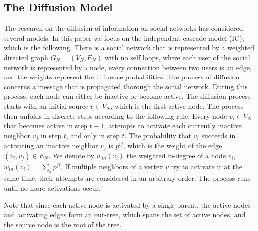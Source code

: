 \documentclass[sigconf,anonymous]{aamas}
\begin{document}
\subsection{The Diffusion Model}
\label{sec:IC_model}
The research on the diffusion of information on social networks has considered several models. In this paper we focus on the independent cascade model (IC), which is the following.
There is a social network that is represented by a weighted directed graph $G_N=(V_N,E_N)$ with no self loops, where each user of the social network is represented by a node, every connection between two users is an edge, and the weights represent the influence probabilities. 
The process of diffusion concerns a message that is propagated thorough the social network. During this process, each node can either be inactive or become active.
The diffusion process starts with an initial source   
$v\in V_N$, which is the first active node.
The process then unfolds in discrete steps according to the following rule. %
Every node $v_i\in V_N$ that becomes active in step $t-1$, attempts to activate each currently inactive neighbor $v_j$ in step $t$, and only in step $t$. The probability that $v_i$ succeeds in activating an inactive neighbor $v_j$ is $p^{ij}$, which is the weight of the edge $(v_i,v_j)\in E_N$. We denote by $w_{in}(v_i)$ the weighted in-degree of a node $v_i$, $w_{in}(v_i) = \sum_j{p^{ji}}$.
If multiple neighbors of a vertex $v$ try to activate it at the same time, their attempts are considered in an arbitrary order. %
The process runs until no more activations occur. %

Note that since each active node is activated by a single parent, the active nodes and activating edges %
form an out-tree, which spans the set of active nodes, and the source node is the root of the tree.

\end{document}
